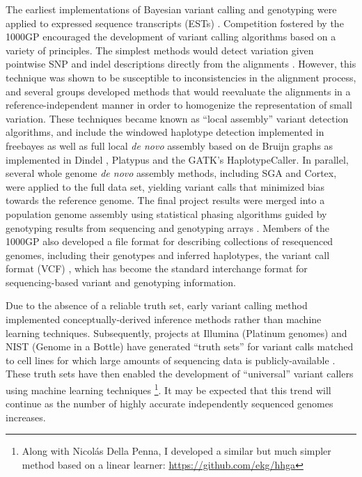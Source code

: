 The earliest implementations of Bayesian variant calling and genotyping were applied to expressed sequence transcripts (ESTs) \cite{marth1999general}.
Competition fostered by the 1000GP encouraged the development of variant calling algorithms based on a variety of principles.
The simplest methods would detect variation given pointwise SNP and indel descriptions directly from the alignments \cite{li2009sequence,depristo2011framework}.
However, this technique was shown to be susceptible to inconsistencies in the alignment process, and several groups developed methods that would reevaluate the alignments in a reference-independent manner in order to homogenize the representation of small variation.
These techniques became known as ``local assembly'' variant detection algorithms, and include the windowed haplotype detection implemented in freebayes \cite{garrison2012haplotype} as well as full local \emph{de novo} assembly based on de Bruijn graphs as implemented in Dindel \cite{albers2010dindel}, Platypus \cite{rimmer2014integrating} and the GATK's HaplotypeCaller.
In parallel, several whole genome \emph{de novo} assembly methods, including SGA and Cortex, were applied to the full data set, yielding variant calls that minimized bias towards the reference genome.
The final project results were merged into a population genome assembly using statistical phasing algorithms \cite{browning2007,howie2011,delaneau2012} guided by genotyping results from sequencing and genotyping arrays \cite{1000g2015}.
Members of the 1000GP also developed a file format for describing collections of resequenced genomes, including their genotypes and inferred haplotypes, the variant call format (VCF) \cite{danecek2011variant}, which has become the standard interchange format for sequencing-based variant and genotyping information.

Due to the absence of a reliable truth set, early variant calling method implemented conceptually-derived inference methods rather than machine learning techniques.
Subsequently, projects at Illumina (Platinum genomes) and NIST (Genome in a Bottle) have generated ``truth sets'' for variant calls matched to cell lines for which large amounts of sequencing data is publicly-available \cite{eberle2013platinum,zook2014integrating}.
These truth sets have then enabled the development of ``universal'' variant callers using machine learning techniques \cite{poplin2017creating}\footnote{Along with Nicol\'{a}s Della Penna, I developed a similar but much simpler method based on a linear learner: \url{https://github.com/ekg/hhga}}.
It may be expected that this trend will continue as the number of highly accurate independently sequenced genomes increases.

